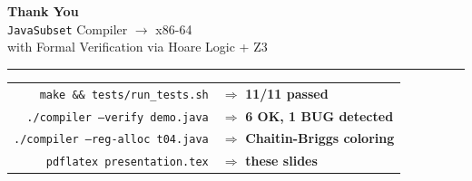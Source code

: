 \documentclass[aspectratio=169,11pt]{beamer}
\begin{document}
\begin{frame}[plain]
  \centering
  \vspace{1.2cm}
  {\Huge\bfseries\color{primary} Thank You}\\[0.7em]
  {\large \texttt{JavaSubset} Compiler $\to$ x86-64}\\[0.3em]
  {\normalsize with Formal Verification via Hoare Logic + Z3}\\[1.2em]
  \hrule
  \vspace{0.5em}
  \begin{tabular}{rl}
    \texttt{make \&\& tests/run\_tests.sh}   & $\Rightarrow$ \textbf{11/11 passed}\\
    \texttt{./compiler --verify demo.java}   & $\Rightarrow$ \textbf{6 OK, 1 BUG detected}\\
    \texttt{./compiler --reg-alloc t04.java} & $\Rightarrow$ \textbf{Chaitin-Briggs coloring}\\
    \texttt{pdflatex presentation.tex}       & $\Rightarrow$ \textbf{these slides}\\
  \end{tabular}
\end{frame}
\end{document}
